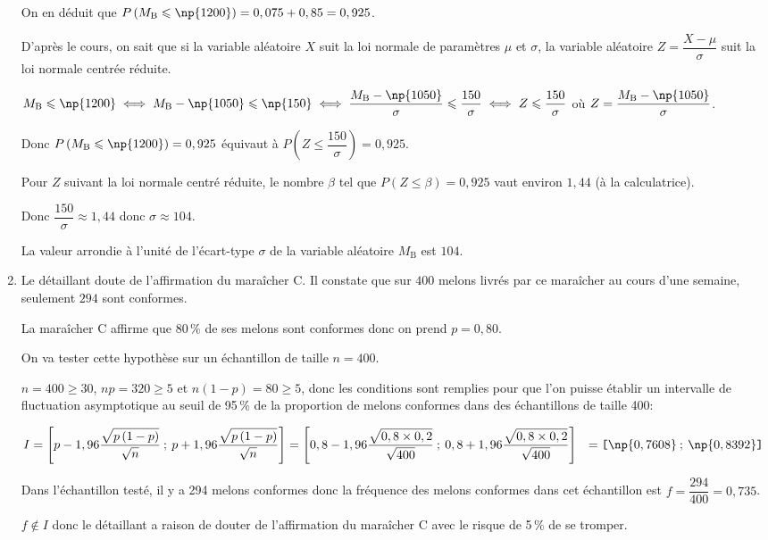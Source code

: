 \documentclass[10pt]{article}
\newcommand{\ds}{\displaystyle}
\newcommand{\cg}{\texttt{]}}%
\newcommand{\cd}{\texttt{[}}%
\begin{document}
\begin{enumerate}
On en déduit que $P\left (M_{\mathrm{B}} \leqslant \np{1200}\right )=0,075+0,85=0,925$.

\smallskip

D'après le cours, on sait que si la variable aléatoire $X$ suit la loi normale de paramètres $\mu$ et $\sigma$, la variable aléatoire $Z=\dfrac{X-\mu}{\sigma}$ suit la loi normale centrée réduite.

$M_{\mathrm{B}} \leqslant \np{1200} 
\iff M_{\mathrm{B}} - \np{1050} \leqslant \np{150}
\iff \dfrac{M_{\mathrm{B}} - \np{1050}}{\sigma} \leqslant \dfrac{150}{\sigma}
\iff Z \leqslant \dfrac{150}{\sigma}$ où
$Z=\dfrac{M_{\mathrm{B}}-\np{1050}}{\sigma}$.

Donc  $P\left (M_{\mathrm{B}} \leqslant \np{1200}\right )=0,925$
équivaut à $P\left (Z \leqslant \dfrac{150}{\sigma}\right )=0,925$.

Pour $Z$ suivant la loi normale centré réduite, le nombre $\beta$ tel que $P(Z \leqslant \beta) = 0,925$ vaut environ $1,44$ (à la calculatrice).

Donc $\dfrac{150}{\sigma} \approx 1,44$ donc $\sigma \approx 104$.

La valeur arrondie à l'unité de l'écart-type $\sigma$ de la variable aléatoire $M_{\text{B}}$ est $104$.

\item  Le détaillant doute de l'affirmation du maraîcher C. Il constate que sur $400$ melons livrés par ce maraîcher au cours d'une semaine, seulement $294$ sont conformes.

La maraîcher C affirme que 80\,\% de ses melons sont conformes donc on prend $p=0,80$.

On va tester cette hypothèse sur un échantillon de taille $n=400$.

$n=400 \geqslant 30$, $np=320 \geqslant 5$ et $n(1-p) = 80 \geqslant 5$, donc les conditions sont remplies pour que l'on puisse établir un intervalle de fluctuation asymptotique au seuil de 95\,\% de la proportion de melons conformes dans des échantillons de taille 400:

\medskip

$I=\left[ p- 1,96 \dfrac{\ds \sqrt{p\left(1-p\right)}}{\ds \sqrt{n}}\:;\: p + 1,96\dfrac{\ds \sqrt{p\left(1-p\right)}}{\ds\sqrt{n}} \right]
= \left[ 0,8- 1,96 \dfrac{\ds \sqrt{0,8\times 0,2}}{\ds \sqrt{400}}\:;\: 0,8 + 1,96\dfrac{\ds \sqrt{0,8\times 0,2}}{\ds\sqrt{400}} \right]\\[5pt]
\phantom{I}
= \cd \np{0,7608}\:;\:\np{0,8392}\cg$

\smallskip

Dans l'échantillon testé, il y a 294 melons conformes donc la fréquence des melons conformes dans cet échantillon est $f=\dfrac{294}{400}=0,735$.

$f \not\in I$ donc le détaillant a raison de douter de l'affirmation du maraîcher C avec le risque de 5\,\% de se tromper.
\end{enumerate}
\end{document}
